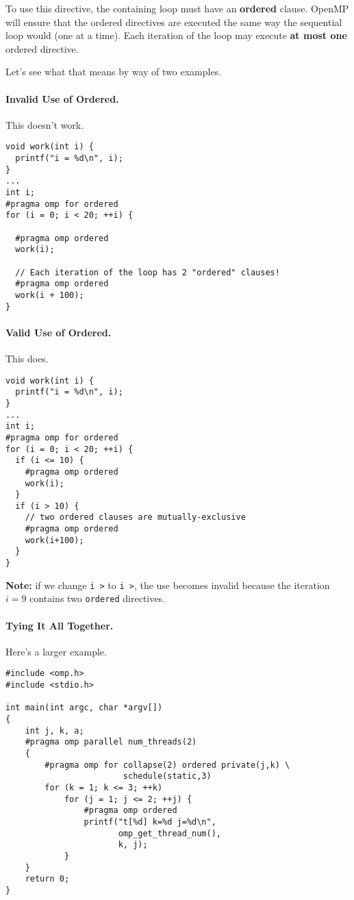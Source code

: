     To use this directive, the containing loop must have an {\bf ordered} clause.
    OpenMP will ensure that the ordered directives are executed the same
      way the sequential loop would (one at a time).
    Each iteration of the loop may execute {\bf at most one} ordered
      directive.

Let's see what that means by way of two examples.

\paragraph{Invalid Use of Ordered.} This doesn't work.

{\small
  \begin{lstlisting}
void work(int i) {
  printf("i = %d\n", i);
}
...
int i;
#pragma omp for ordered
for (i = 0; i < 20; ++i) {

  #pragma omp ordered
  work(i);

  // Each iteration of the loop has 2 "ordered" clauses!
  #pragma omp ordered 
  work(i + 100);
}
  \end{lstlisting}
}

\paragraph{Valid Use of Ordered.} This does.
{\small  \begin{lstlisting}
void work(int i) {
  printf("i = %d\n", i);
}
...
int i;
#pragma omp for ordered
for (i = 0; i < 20; ++i) {
  if (i <= 10) {
    #pragma omp ordered
    work(i);
  }
  if (i > 10) {
    // two ordered clauses are mutually-exclusive
    #pragma omp ordered
    work(i+100);
  }
}
  \end{lstlisting}
}

{\bf Note:} if we change {\tt i \textgreater{}} to {\tt i \textgreater{}}, 
the use becomes invalid because the iteration $i=9$ contains two {\tt ordered}
directives.

  \paragraph{Tying It All Together.} Here's a larger example.

  \begin{lstlisting}
#include <omp.h>
#include <stdio.h>

int main(int argc, char *argv[])
{
    int j, k, a;
    #pragma omp parallel num_threads(2)
    {
        #pragma omp for collapse(2) ordered private(j,k) \
                        schedule(static,3)
        for (k = 1; k <= 3; ++k)
            for (j = 1; j <= 2; ++j) {
                #pragma omp ordered
                printf("t[%d] k=%d j=%d\n",
                       omp_get_thread_num(),
                       k, j);
            }
    }
    return 0;
}
  \end{lstlisting}

